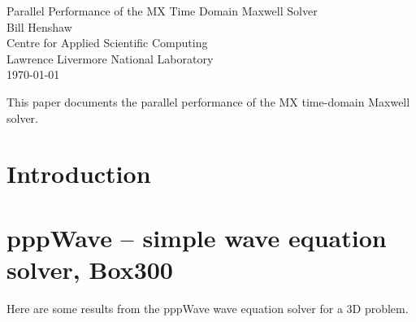 \documentclass[12pt]{article}
\begin{document}



\newcommand{\Div}{\grad\cdot}
\newcommand{\tauv}{\boldsymbol{\tau}}
\newcommand{\sumi}{\sum_{i=1}^n}
\newcommand{\deltaT}{{\Delta t}}
\newcommand{\dt}{{\Delta t}}
\newcommand{\figWidth}{.3\linewidth}

\vspace{5\baselineskip}
\begin{flushleft}
{\LARGE Parallel Performance of the MX Time Domain Maxwell Solver} \\
\vspace{2\baselineskip}
Bill Henshaw  \\
Centre for Applied Scientific Computing  \\
Lawrence Livermore National Laboratory      \\
\vspace{\baselineskip}
\today\\

\vspace{2\baselineskip}


This paper documents the parallel performance of the MX time-domain Maxwell solver.

\end{flushleft}

\tableofcontents

\newcommand{\eps}{\epsilon}
\clearpage
\section{Introduction}

\clearpage
\section{pppWave -- simple wave equation solver, Box300}

Here are some results from the pppWave wave equation solver for a 3D problem.
\end{document}
